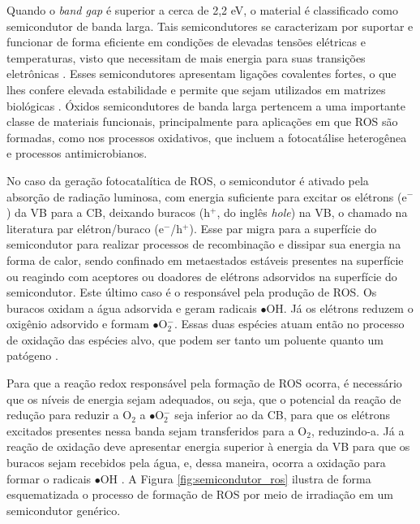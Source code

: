 Quando o \textit{band gap} é superior a cerca de 2,2 eV, o material é classificado como semicondutor de banda larga. Tais semicondutores se caracterizam por suportar e funcionar de forma eficiente em condições de elevadas tensões elétricas e temperaturas, visto que necessitam de mais energia para suas transições eletrônicas \cite{lu2024systematic,nguyen2021wide}. Esses semicondutores apresentam ligações covalentes fortes, o que lhes confere elevada estabilidade e permite que sejam utilizados em matrizes biológicas \cite{nguyen2021wide}. Óxidos semicondutores de banda larga pertencem a uma importante classe de materiais funcionais, principalmente para aplicações em que ROS são formadas, como nos processos oxidativos, que incluem a fotocatálise heterogênea e processos antimicrobianos.

No caso da geração fotocatalítica de ROS, o semicondutor é ativado pela absorção de radiação luminosa, com energia suficiente para excitar os elétrons (e$^-$) da VB para a CB, deixando buracos (h$^+$, do inglês \textit{hole}) na VB, o chamado na literatura par elétron/buraco (e$^-$/h$^+$). Esse par migra para a superfície do semicondutor para realizar processos de recombinação e dissipar sua energia na forma de calor, sendo confinado em metaestados estáveis presentes na superfície ou reagindo com aceptores ou doadores de elétrons adsorvidos na superfície do semicondutor. Este último caso é o responsável pela produção de ROS. Os buracos oxidam a água adsorvida e geram radicais ${\bullet}$OH. Já os elétrons reduzem o oxigênio adsorvido e formam ${\bullet}$O$_{2}^-$. Essas duas espécies atuam então no processo de oxidação das espécies alvo, que podem ser tanto um poluente quanto um patógeno \cite{shan2010immobilisation,nascimento2022influence,macedo2022zinc,abubakar2022review}.

Para que a reação redox responsável pela formação de ROS ocorra, é necessário que os níveis de energia sejam adequados, ou seja, que o potencial da reação de redução para reduzir a O$_2$ a ${\bullet}$O$_{2}^{-}$ seja inferior ao da CB, para que os elétrons excitados presentes nessa banda sejam transferidos para a O$_2$, reduzindo-a. Já a reação de oxidação deve apresentar energia superior à energia da VB para que os buracos sejam  recebidos pela água, e, dessa maneira, ocorra a oxidação para formar o radicais ${\bullet}$OH \cite{wang2018design}. A Figura \ref{fig:semicondutor_ros} ilustra de forma esquematizada o processo de formação de ROS por meio de irradiação em um semicondutor genérico.


